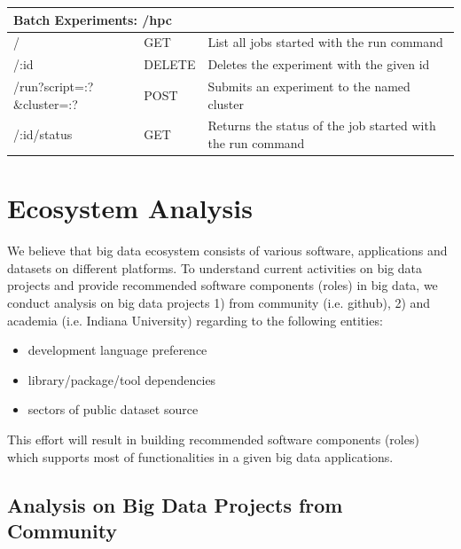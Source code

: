 \documentclass[9pt,twocolumn,twoside]{styles/osajnl}
\newcommand{\grey}{\cellcolor{lightgray}}  %
\begin{document}
\begin{table}[htb]
\begin{center}
\begin{small}
\begin{tabular}{|l|l|l|}
\hline \multicolumn{3}{|l|}{\grey\bf Batch Experiments: /hpc} \tabularnewline \hline
/                          & GET    & List all jobs started with the run command \tabularnewline \hline
/:id                       & DELETE & Deletes the experiment with the given id \tabularnewline \hline
/run?script=:?\&cluster=:? & POST   & Submits an experiment to the named cluster \tabularnewline \hline
/:id/status                & GET    & Returns the status of the job started with the run command \tabularnewline \hline

      \end{tabular}
    \end{small}
  \end{center}
\end{table}

\section{Ecosystem Analysis}

We believe that big data ecosystem consists of various software,
applications and datasets on different platforms. To understand
current activities on big data projects and provide recommended
software components (roles) in big data, we conduct analysis on big
data projects 1) from community (i.e. github), 2) and academia
(i.e. Indiana University) regarding to the following entities:

\begin{itemize}
\item development language preference
\item library/package/tool dependencies
\item sectors of public dataset source
\end{itemize}

This effort will result in building recommended software components
(roles) which supports most of functionalities in a given big data
applications.

\subsection{Analysis on Big Data Projects from Community}
\end{document}

